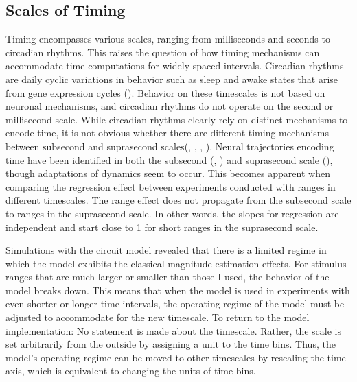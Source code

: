 \documentclass[10pt, a4paper]{article}
\begin{document}
\subsection{Scales of Timing}
Timing encompasses various scales, ranging from milliseconds and seconds to circadian rhythms. This raises the question of how timing mechanisms can accommodate time computations for widely spaced intervals. 
Circadian rhythms are daily cyclic variations in behavior such as sleep and awake states that arise from gene expression cycles (\cite{Patke2020}). Behavior on these timescales is not based on neuronal mechanisms, and circadian rhythms do not operate on the second or millisecond scale. 
While circadian rhythms clearly rely on distinct mechanisms to encode time, it is not obvious whether there are different timing mechanisms between subsecond and suprasecond scales(\cite{Buonomano2002}, \cite{Buonomano2007}, \cite{Paton2018}, \cite{Tsao2022}). %
Neural trajectories encoding time have been identified in both the subsecond (\cite{Sohn2019}, \cite{Meirhaeghe2021}) and suprasecond scale (\cite{Henke2021}), though adaptations of dynamics seem to occur.
This becomes apparent when comparing the regression effect between experiments conducted with ranges in different timescales. 
The range effect does not propagate from the subsecond scale to ranges in the suprasecond scale. In other words, the slopes for regression are independent and start close to 1 for short ranges in the suprasecond scale. 

Simulations with the circuit model revealed that there is a limited regime in which the model exhibits the classical magnitude estimation effects. 
For stimulus ranges that are much larger or smaller than those I used, the behavior of the model breaks down.
This means that when the model is used in experiments with even shorter or longer time intervals, the operating regime of the model must be adjusted to accommodate for the new timescale.
To return to the model implementation: No statement is made about the timescale.  Rather, the scale is set arbitrarily from the outside by assigning a unit to the time bins. 
Thus, the model's operating regime can be moved to other timescales by rescaling the time axis, which is equivalent to changing the units of time bins.
\end{document}
